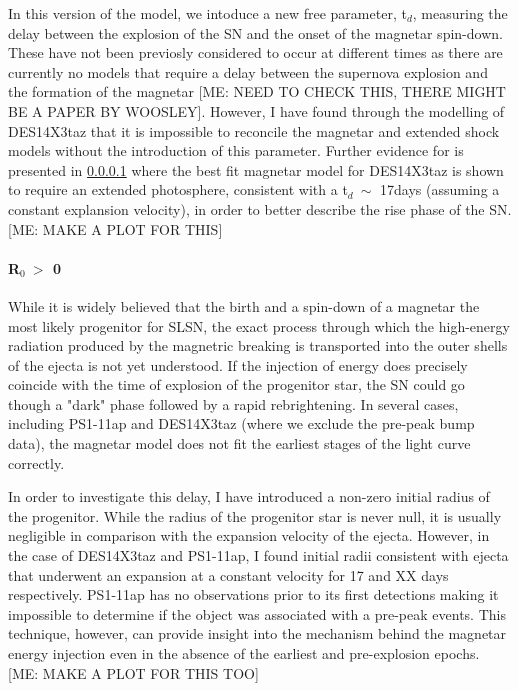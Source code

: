 In this version of the model, we intoduce a new free parameter, t$_d$, measuring the delay between the explosion of the SN and the onset of the magnetar spin-down. These have not been previosly considered to occur at different times \citep{Nicolls} as there are currently no models that require a delay between the supernova explosion and the formation of the magnetar [ME: NEED TO CHECK THIS, THERE MIGHT BE A PAPER BY WOOSLEY]. However, I have found through the modelling of DES14X3taz that it is impossible to reconcile the magnetar and extended shock models without the introduction of this parameter. Further evidence for is presented in \cref{par:R0nonzero} where the best fit magnetar model for DES14X3taz is shown to require an extended photosphere, consistent with a t$_d ~\sim$ 17days (assuming a constant explansion velocity), in order to better describe the rise phase of the SN.
[ME: MAKE A PLOT FOR THIS]

\paragraph{R$_0~>$ 0}
\label{par:R0nonzero}
While it is widely believed that the birth and a spin-down of a magnetar the most likely progenitor for SLSN, the exact process through which the high-energy radiation produced by the magnetric breaking is transported into the outer shells of the ejecta is not yet understood. If the injection of energy does precisely coincide with the time of explosion of the progenitor star, the SN could go though a "dark" phase followed by a rapid rebrightening. In several cases, including PS1-11ap and DES14X3taz (where we exclude the pre-peak bump data), the magnetar model does not fit the earliest stages of the light curve correctly.

In order to investigate this delay, I have introduced a non-zero initial radius of the progenitor. While the radius of the progenitor star is never null, it is usually negligible in comparison with the expansion velocity of the ejecta. However, in the case of DES14X3taz and PS1-11ap, I found initial radii consistent with ejecta that underwent an expansion at a constant velocity for 17 and XX days respectively. PS1-11ap has no observations prior to its first detections making it impossible to determine if the object was associated with a pre-peak events. This technique, however, can provide insight into the mechanism behind the magnetar energy injection even in the absence of the earliest and pre-explosion epochs. [ME: MAKE A PLOT FOR THIS TOO]

